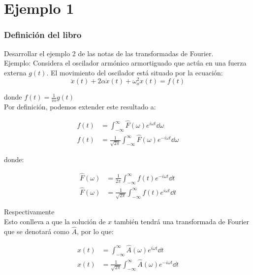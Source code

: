 \documentclass[11pt]{report}
\theoremstyle{plain}
\theoremstyle{definition}
\begin{document}

\tableofcontents

\part{Ejemplo 1}
\section{Definición del libro}

Desarrollar el ejemplo 2 de las notas de las transformadas de Fourier.\\
Ejemplo: Considera el oscilador armónico armortiguado que actúa en una fuerza externa $g(t)$. El movimiento del oscilador está situado por la ecuación:\\
\begin{equation*}
	\ddot{x}(t) + 2\alpha \dot x (t) + \omega^2_o x(t) = f(t)
\end{equation*}

donde $f(t) = \frac{1}{m} g(t)$\\

Por definición, podemos extender este resultado a:

\begin{align*}
	f(t) &= \int_{-\infty}^\infty \hat F(\omega) e^{i\omega t}\dd{\omega}\\
	f(t) &= \frac{1}{\sqrt{2\pi}}\int_{-\infty}^\infty \hat F(\omega) e^{-i\omega t} \dd{\omega}
\end{align*}

donde:

\begin{align*}
	\hat F(\omega)&=\frac{1}{2\pi}\int_{-\infty}^\infty f(t)e^{-i\omega t}\dd{t}\\
	\hat F(\omega) &= \frac{1}{\sqrt{2\pi}}\int_{-\infty}^\infty f(t)e^{i\omega t}\dd{t}
\end{align*}

Respectivamente\\

Esto conlleva a que la solución de $x$ también tendrá una transformada de Fourier que se denotará como $\hat A$, por lo que:

\begin{align*}
	x(t) &= \int_{-\infty}^\infty \hat A(\omega) e^{i\omega t}\dd{t}\\
	x(t) &= \frac{1}{\sqrt{2\pi}}\int_{-\infty}^\infty \hat A(\omega) e^{-i\omega t}\dd{t}
\end{align*}
\end{document}
